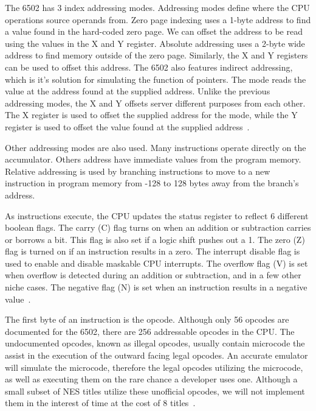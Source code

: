 \documentclass[12pt]{article}
\begin{document}
The 6502 has 3 index addressing modes. Addressing modes define where the CPU operations source operands
from. Zero page indexing uses a 1-byte address to find a value found in the hard-coded zero page.
We can offset the address to be read using the values in the X and Y register. Absolute addressing 
uses a 2-byte wide address to find memory outside of the zero page. Similarly, the X and Y registers
can be used to offset this address. The 6502 also features indirect addressing, which is it's solution
for simulating the function of pointers. The mode reads the value at the address found at the supplied
address. Unlike the previous addressing modes, the X and Y offsets server different purposes from
each other. The X register is used to offset the supplied address for the mode, while the Y register
is used to offset the value found at the supplied address~\cite{addressing_modes}.

Other addressing modes are also used. Many instructions operate directly on the accumulator. Others address
have immediate values from the program memory. Relative addressing is used by branching instructions
to move to a new instruction in program memory from -128 to 128 bytes away from the branch's address.

As instructions execute, the CPU updates the status register to reflect 6 different boolean flags. The
carry (C) flag turns on when an addition or subtraction carries or borrows a bit. This flag is also set if
a logic shift pushes out a 1.
The zero (Z) flag is turned on if an instruction results in a zero. The interrupt disable flag is used to enable and disable
maskable CPU interrupts. The overflow flag (V) is set when overflow is detected during an addition or subtraction,
and in a few other niche cases. The negative flag (N) is set when an instruction results in a negative value~\cite{status_flags}.

The first byte of an instruction is the opcode. Although only 56 opcodes are documented for the 6502,
there are 256 addressable opcodes in the CPU. The undocumented opcodes, known as illegal opcodes, usually
contain microcode the assist in the execution of the outward facing legal opcodes. An accurate emulator
will simulate the microcode, therefore the legal opcodes utilizing the microcode, as well as executing
them on the rare chance a developer uses one. Although a small subset of NES titles utilize these unofficial
opcodes, we will not implement them in the interest of time at the cost of 8 titles~\cite{illegal_ops}.
\end{document}
